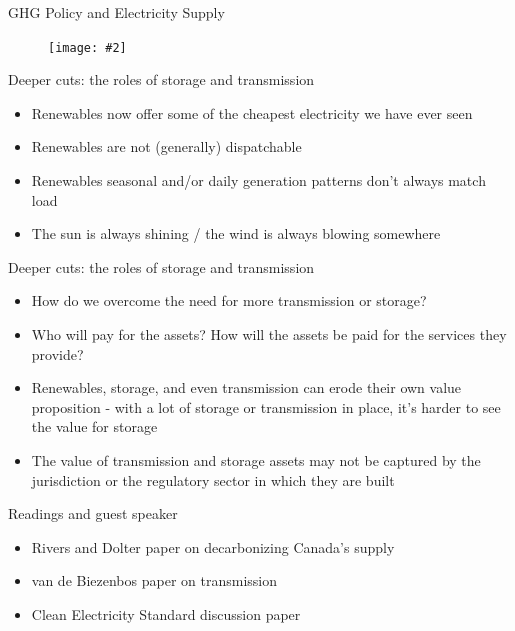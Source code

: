\documentclass[aspectratio=169]{beamer}
\makeatletter
\renewcommand{\(}{\begin{columns}}
\renewcommand{\)}{\end{columns}}
\newcommand{\<}[1]{\begin{column}{#1}}
\renewcommand{\>}{\end{column}}
\newcommand{\fitimage}[2][\@nil]{
  \begin{figure}
    \begin{adjustbox}{width=0.95\textwidth, totalheight=\textheight-2\baselineskip-2\baselineskip,keepaspectratio}
      \texttt{[image: \#2]}
    \end{adjustbox}
    \def\tmp{#1}%
   \ifx\tmp\@nnil
      \else
      \newline{\tiny{#1}}
    \fi
  \end{figure}
}
\makeatother
\begin{document}
\begin{frame}{GHG Policy and Electricity Supply}
   \fitimage{../images/monthly_ghgs.png}
   \vfill
\end{frame}


\begin{frame}{Deeper cuts: the roles of storage and transmission}
\begin{itemize}
\setlength\itemsep{2em}
\item Renewables now offer some of the cheapest electricity we have ever seen
\item Renewables are not (generally) dispatchable
\item Renewables seasonal and/or daily generation patterns don't always match load
\item The sun is always shining / the wind is always blowing somewhere
\end{itemize}

\vfill \end{frame}



\begin{frame}{Deeper cuts: the roles of storage and transmission}
\begin{itemize}
\setlength\itemsep{2em}
\item How do we overcome the need for more transmission or storage?
\item Who will pay for the assets? How will the assets be paid for the services they provide?
\item Renewables, storage, and even transmission can erode their own value proposition - with a lot of storage or transmission in place, it's harder to see the value for storage
\item The value of transmission and storage assets may not be captured by the jurisdiction or the regulatory sector in which they are built

\end{itemize}

\vfill \end{frame}



\begin{frame}{Readings and guest speaker}
\begin{itemize}
\setlength\itemsep{2em}
\item Rivers and Dolter paper on decarbonizing Canada's supply
\item van de Biezenbos paper on transmission

\item Clean Electricity Standard discussion paper

\end{itemize}

\vfill \end{frame}
\end{document}

